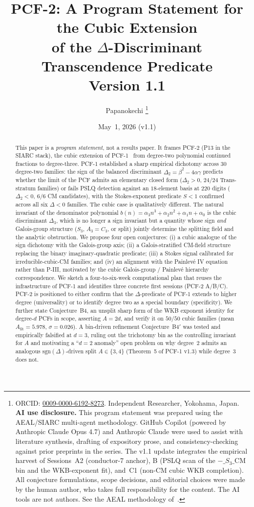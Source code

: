 \documentclass[11pt,a4paper]{article}
\title{PCF-2: A Program Statement for the Cubic Extension\\
       of the $\Delta$-Discriminant Transcendence Predicate\\
       \large Version 1.1}
\author{Papanokechi%
\thanks{ORCID: \href{https://orcid.org/0009-0000-6192-8273}{0009-0000-6192-8273}.
Independent Researcher, Yokohama, Japan.
\textbf{AI use disclosure.} This program statement was prepared using the
AEAL/SIARC multi-agent methodology. GitHub Copilot (powered by Anthropic
Claude Opus 4.7) and Anthropic Claude were used to assist with literature
synthesis, drafting of expository prose, and consistency-checking against
prior preprints in the series. The v1.1 update integrates the empirical
harvest of Sessions~A2 (conductor-7 anchor), B (PSLQ scan of the
$-\_S_3\_\mathrm{CM}$ bin and the WKB-exponent fit), and~C1 (non-CM cubic
WKB completion). All conjecture formulations, scope decisions, and
editorial choices were made by the human author, who takes full
responsibility for the content. The AI tools are not authors. See the
AEAL methodology of~\cite{P8AEAL}.}}
\date{May~1, 2026 (v1.1)}
\theoremstyle{definition}
\theoremstyle{remark}
\begin{document}
\maketitle

\begin{abstract}
This paper is a \emph{program statement}, not a results paper. It frames
PCF-2 (P13 in the SIARC stack), the cubic extension of
PCF-1~\cite{Papanokechi2026PCF1} from degree-two polynomial continued
fractions to degree-three. PCF-1 established a sharp empirical dichotomy
across $30$ degree-two families: the sign of the balanced discriminant
$\Delta_{2}=\beta^{2}-4\alpha\gamma$ predicts whether the limit of the
PCF admits an elementary closed form ($\Delta_{2}>0$, $24/24$ Trans-stratum
families) or fails PSLQ detection against an $18$-element basis at $220$
digits ($\Delta_{2}<0$, $6/6$ CM candidates), with the Stokes-exponent
predicate $S<1$ confirmed across all six $\Delta<0$ families. The cubic
case is qualitatively different. The natural invariant of the denominator
polynomial $b(n)=\alpha_{3}n^{3}+\alpha_{2}n^{2}+\alpha_{1}n+\alpha_{0}$ is
the cubic discriminant $\Delta_{3}$, which is no longer a sign invariant
but a quantity whose sign \emph{and} Galois-group structure
($S_{3}$, $A_{3}=C_{3}$, or split) jointly determine the splitting field
and the analytic obstruction. We propose four open conjectures:
(i) a cubic analogue of the sign dichotomy with the Galois-group axis;
(ii) a Galois-stratified CM-field structure replacing the binary
imaginary-quadratic predicate;
(iii) a Stokes signal calibrated for irreducible-cubic-CM families;
and (iv) an alignment with the Painlev\'e IV equation rather than P-III,
motivated by the cubic Galois-group / Painlev\'e hierarchy correspondence.
We sketch a four-to-six-week computational plan that reuses the
infrastructure of PCF-1 and identifies three concrete first sessions
(PCF-2 A/B/C). PCF-2 is positioned to either confirm that the
$\Delta$-predicate of PCF-1 extends to higher degree (universality) or to
identify degree two as a special boundary (specificity).
We further state Conjecture~B4, an unsplit sharp form of the WKB
exponent identity for degree-$d$ PCFs in scope, asserting $A=2d$, and
verify it on $50/50$ cubic families (mean $A_{\mathrm{fit}}=5.978$,
$\sigma=0.026$).
A bin-driven refinement Conjecture~B4$'$ was tested and empirically
falsified at $d=3$, ruling out the trichotomy bin as the controlling
invariant for $A$ and motivating a ``$d=2$ anomaly'' open problem on
why degree~$2$ admits an analogous $\mathrm{sgn}(\Delta)$-driven split
$A\in\{3,4\}$ (Theorem~5 of PCF-1 v1.3) while degree~$3$ does not.
\end{abstract}
\end{document}

